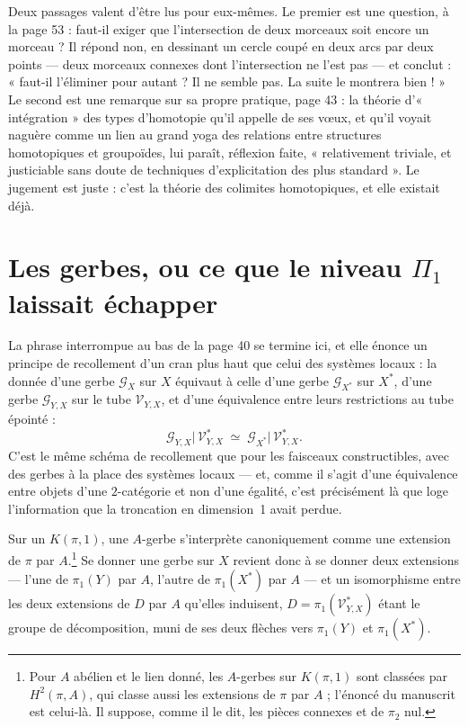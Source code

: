 \documentclass[11pt,a4paper]{article}
\begin{document}
\begin{resume}
Deux passages valent d'être lus pour eux-mêmes. Le premier est une question, à
la page 53 : faut-il exiger que l'intersection de deux morceaux soit encore un
morceau ? Il répond non, en dessinant un cercle coupé en deux arcs par deux
points — deux morceaux connexes dont l'intersection ne l'est pas — et conclut :
« faut-il l'éliminer pour autant ? Il ne semble pas. La suite le montrera bien ! »
Le second est une remarque sur sa propre pratique, page 43 : la théorie
d'« intégration » des types d'homotopie qu'il appelle de ses vœux, et qu'il
voyait naguère comme un lien au grand yoga des relations entre structures
homotopiques et groupoïdes, lui paraît, réflexion faite, « relativement triviale,
et justiciable sans doute de techniques d'explicitation des plus standard ». Le
jugement est juste : c'est la théorie des colimites homotopiques, et elle
existait déjà.

\end{resume}

\section*{Les gerbes, ou ce que le niveau $\Pi_{1}$ laissait échapper}

La phrase interrompue au bas de la page 40 se termine ici, et elle énonce un
principe de recollement d'un cran plus haut que celui des systèmes locaux : la
donnée d'une gerbe $\mathcal{G}_{X}$ sur $X$ équivaut à celle d'une gerbe
$\mathcal{G}_{X^{*}}$ sur $X^{*}$, d'une gerbe $\mathcal{G}_{Y,X}$ sur le tube
$\mathcal{V}_{Y,X}$, et d'une équivalence entre leurs restrictions au tube
épointé :
\[
  \mathcal{G}_{Y,X}\bigl|\,\mathcal{V}^{*}_{Y,X} \;\simeq\;
  \mathcal{G}_{X^{*}}\bigl|\,\mathcal{V}^{*}_{Y,X}.
\]
C'est le même schéma de recollement que pour les faisceaux constructibles, avec
des gerbes à la place des systèmes locaux — et, comme il s'agit d'une
équivalence entre objets d'une $2$-catégorie et non d'une égalité, c'est
précisément là que loge l'information que la troncation en dimension~1 avait
perdue.

Sur un $K(\pi,1)$, une $A$-gerbe s'interprète canoniquement comme une extension
de $\pi$ par $A$.\footnote{Pour $A$ abélien et le lien donné, les $A$-gerbes sur
$K(\pi,1)$ sont classées par $H^{2}(\pi,A)$, qui classe aussi les extensions de
$\pi$ par $A$ ; l'énoncé du manuscrit est celui-là. Il suppose, comme il le dit,
les pièces connexes et de $\pi_{2}$ nul.} Se donner une gerbe sur $X$ revient
donc à se donner deux extensions — l'une de $\pi_{1}(Y)$ par $A$, l'autre de
$\pi_{1}(X^{*})$ par $A$ — et un isomorphisme entre les deux extensions de $D$
par $A$ qu'elles induisent, $D = \pi_{1}(\mathcal{V}^{*}_{Y,X})$ étant le groupe
de décomposition, muni de ses deux flèches vers $\pi_{1}(Y)$ et
$\pi_{1}(X^{*})$.
\end{document}
